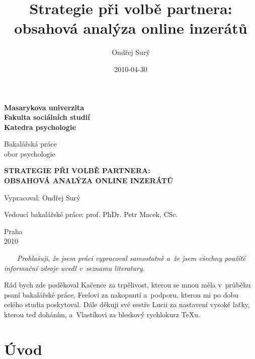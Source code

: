 \documentclass[a4paper, 12pt, notitlepage, oneside, numbers=noenddot]{report}
\title{Strategie při volbě partnera: obsahová analýza online inzerátů}
\author{Ondřej Surý}
\date{2010-04-30}
\begin{document}
\pagestyle{empty}
\begin{titlepage}

  \begin{center}
    \bf{Masarykova univerzita}\\
    \bf{Fakulta sociálních studií}\\
    \bf{Katedra psychologie}\\

    \vspace{2cm}

    Bakalářská práce\\
    obor psychologie

    \vspace{2cm}

    \large{\bf{STRATEGIE PŘI VOLBĚ PARTNERA:\\ OBSAHOVÁ ANALÝZA ONLINE INZERÁTŮ}}\\

    \normalsize

    \vspace{2cm}

    \noindent Vypracoval: Ondřej Surý\\
    \vspace{2cm}

    \noindent Vedoucí bakalářské práce: prof. PhDr. Petr Macek, CSc. \\
  
    \vfill

    Praha\\
    2010
  \end{center}
\end{titlepage}

\pagestyle{empty}
~~~
\vfill
\emph{Prohlašuji, že jsem práci vypracoval samostatně a~že jsem všechny použité informační zdroje uvedl v~seznamu literatury.}
\clearpage

Rád bych zde poděkoval Kačence za trpělivost, kterou se mnou měla
v~průběhu psaní bakalářské práce, Feelovi za nakopnutí a~podporu,
kterou mi po dobu celého studia poskytoval.  Dále děkuji své sestře
Lucii za nastavení vysoké laťky, kterou teď doháním, a~Vlastíkovi za
bleskový rychlokurz TeXu.

\clearpage
\thispagestyle{empty}
\tableofcontents
\clearpage
\thispagestyle{empty}
\listoftables
\clearpage

\pagestyle{plain}
\setcounter{page}{1}

\chapter{Úvod}
\end{document}
